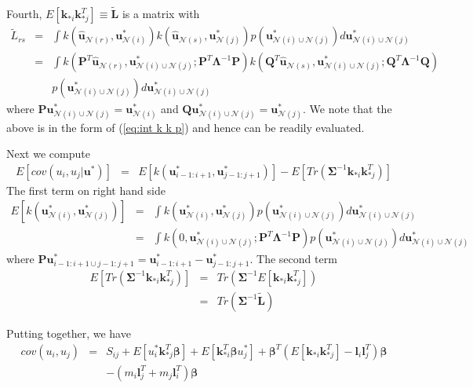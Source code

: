 \documentclass[smallextended,natbib]{svjour3}       %
\begin{document}
Fourth, $E[\mathbf{k}_{*i}\mathbf{k}_{*j}^{T}]\equiv\tilde{\mathbf{L}}$ is a matrix with 
\begin{eqnarray*}
\tilde{L}_{rs} & = & \int k(\hat{\mathbf{u}}_{\mathcal{N}(r)},\mathbf{u}_{\mathcal{N}(i)}^{*})k(\hat{\mathbf{u}}_{\mathcal{N}(s)},\mathbf{u}_{\mathcal{N}(j)}^{*})p(\mathbf{u}_{\mathcal{N}(i)\cup\mathcal{N}(j)}^{*})d\mathbf{u}_{\mathcal{N}(i)\cup\mathcal{N}(j)}^{*}\\
 & = & \int k(\mathbf{P}^{T}\hat{\mathbf{u}}_{\mathcal{N}(r)},\mathbf{u}_{\mathcal{N}(i)\cup\mathcal{N}(j)}^{*};\mathbf{P}^{T}\boldsymbol{\Lambda}^{-1}\mathbf{P})k(\mathbf{Q}^{T}\hat{\mathbf{u}}_{\mathcal{N}(s)},\mathbf{u}_{\mathcal{N}(i)\cup\mathcal{N}(j)}^{*};\mathbf{Q}^{T}\boldsymbol{\Lambda}^{-1}\mathbf{Q})\\
 & & p(\mathbf{u}_{\mathcal{N}(i)\cup\mathcal{N}(j)}^{*})d\mathbf{u}_{\mathcal{N}(i)\cup\mathcal{N}(j)}^{*}
\end{eqnarray*}
where $\mathbf{P}\mathbf{u}_{\mathcal{N}(i)\cup\mathcal{N}(j)}^{*}=\mathbf{u}_{\mathcal{N}(i)}^{*}$ and $\mathbf{Q}\mathbf{u}_{\mathcal{N}(i)\cup\mathcal{N}(j)}^{*}=\mathbf{u}_{\mathcal{N}(j)}^{*}$. We note that the above is in the form of (\ref{eq:int k k p}) and hence can be readily evaluated. 

Next we compute 
\begin{eqnarray*}
E[cov(u_{i},u_{j}\vert\mathbf{u}^{*})] & = & E[k(\mathbf{u}_{i-1:i+1}^{*},\mathbf{u}_{j-1:j+1}^{*})]-E[Tr(\boldsymbol{\Sigma}^{-1}\mathbf{k}_{*i}\mathbf{k}_{*j}^{T})]
\end{eqnarray*}
The first term on right hand side 
\begin{eqnarray*}
E[k(\mathbf{u}_{\mathcal{N}(i)}^{*},\mathbf{u}_{\mathcal{N}(j)}^{*})] & = & \int k(\mathbf{u}_{\mathcal{N}(i)}^{*},\mathbf{u}_{\mathcal{N}(j)}^{*})p(\mathbf{u}_{\mathcal{N}(i)\cup\mathcal{N}(j)}^{*})d\mathbf{u}_{\mathcal{N}(i)\cup\mathcal{N}(j)}^{*}\\
 & = & \int k(0,\mathbf{u}_{\mathcal{N}(i)\cup\mathcal{N}(j)}^{*};\mathbf{P}^{T}\boldsymbol{\Lambda}^{-1}\mathbf{P})p(\mathbf{u}_{\mathcal{N}(i)\cup\mathcal{N}(j)}^{*})d\mathbf{u}_{\mathcal{N}(i)\cup\mathcal{N}(j)}^{*}
\end{eqnarray*}
where $\mathbf{P}\mathbf{u}_{i-1:i+1\cup j-1:j+1}^{*}=\mathbf{u}_{i-1:i+1}^{*}-\mathbf{u}_{j-1:j+1}^{*}$. The second term
\begin{eqnarray*}
E[Tr(\boldsymbol{\Sigma}^{-1}\mathbf{k}_{*i}\mathbf{k}_{*j}^{T})] & = & Tr(\boldsymbol{\Sigma}^{-1}E[\mathbf{k}_{*i}\mathbf{k}_{*j}^{T}])\\
 & = & Tr(\boldsymbol{\Sigma}^{-1}\tilde{\mathbf{L}})
\end{eqnarray*}

Putting together, we have 
\begin{align}
cov(u_{i},u_{j}) & = & S_{ij}+E[u_{i}^{*}\mathbf{k}_{*j}^{T}\boldsymbol{\beta}]+E[\mathbf{k}_{*i}^{T}\boldsymbol{\beta}u_{j}^{*}]+\boldsymbol{\beta}^{T}(E[\mathbf{k}_{*i}\mathbf{k}_{*j}^{T}]-\mathbf{l}_{i}\mathbf{l}_{j}^{T})\boldsymbol{\beta} \nonumber \\
&  & -(m_{i}\mathbf{l}_{j}^{T}+m_{j}\mathbf{l}_{i}^{T})\boldsymbol{\beta} \label{eq:cov(u)}
\end{align}
\end{document}
